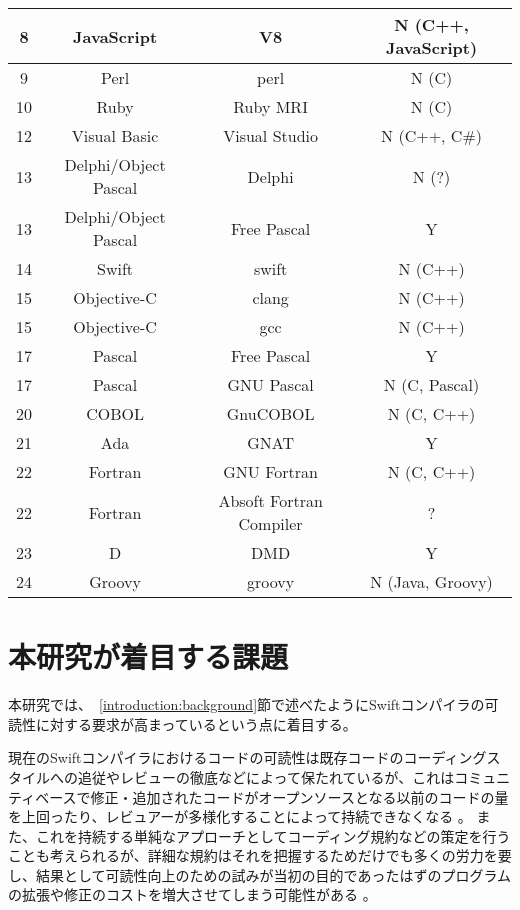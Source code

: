 \begin{table}[hb]
\begin{center}
\begin{tabular}{|c|c|c|c|}
            \hline
            8 & JavaScript & V8 & N (C++, JavaScript) \\
            \hline
            9 & Perl & perl & N (C) \\
            \hline
            10 & Ruby & Ruby MRI & N (C) \\
            \hline
            12 & Visual Basic & Visual Studio & N (C++, C\#) \\
            \hline
            13 & Delphi/Object Pascal & Delphi & N (?) \\
            \hline
            13 & Delphi/Object Pascal & Free Pascal & Y \\
            \hline
            14 & Swift & swift & N (C++) \\
            \hline
            15 & Objective-C & clang & N (C++) \\
            \hline
            15 & Objective-C & gcc & N (C++) \\
            \hline
            17 & Pascal & Free Pascal & Y \\
            \hline
            17 & Pascal & GNU Pascal & N (C, Pascal) \\
            \hline
            20 & COBOL & GnuCOBOL & N (C, C++) \\
            \hline
            21 & Ada & GNAT & Y \\
            \hline
            22 & Fortran & GNU Fortran & N (C, C++) \\
            \hline
            22 & Fortran & Absoft Fortran Compiler & ? \\
            \hline
            23 & D & DMD & Y \\
            \hline
            24 & Groovy & groovy & N (Java, Groovy) \\
            \hline
        \end{tabular}
        \label{table:bootstrapping-languages}
    \end{center}
\end{table}


\section{本研究が着目する課題}
\label{introduction:issue}

本研究では、~\ref{introduction:background}節で述べたようにSwiftコンパイラの可読性に対する要求が高まっているという点に着目する。

現在のSwiftコンパイラにおけるコードの可読性は既存コードのコーディングスタイルへの追従やレビューの徹底などによって保たれているが、これはコミュニティベースで修正・追加されたコードがオープンソースとなる以前のコードの量を上回ったり、レビュアーが多様化することによって持続できなくなる
。
また、これを持続する単純なアプローチとしてコーディング規約などの策定を行うことも考えられるが、詳細な規約はそれを把握するためだけでも多くの労力を要し、結果として可読性向上のための試みが当初の目的であったはずのプログラムの拡張や修正のコストを増大させてしまう可能性がある
。


